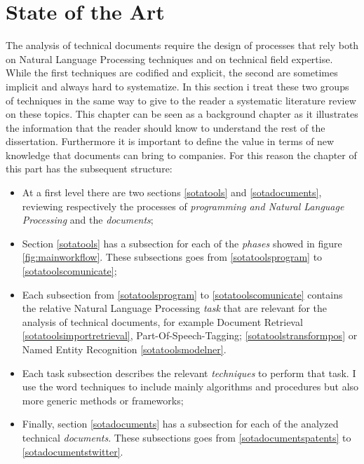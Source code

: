 \documentclass[b5paper,]{book}
\theoremstyle{definition}
\theoremstyle{definition}
\theoremstyle{definition}
\theoremstyle{remark}
\begin{document}
\part{State of the Art}\label{part-state-of-the-art}

The analysis of technical documents require the design of processes that
rely both on Natural Language Processing techniques and on technical
field expertise. While the first techniques are codified and explicit,
the second are sometimes implicit and always hard to systematize. In
this section i treat these two groups of techniques in the same way to
give to the reader a systematic literature review on these topics. This
chapter can be seen as a background chapter as it illustrates the
information that the reader should know to understand the rest of the
dissertation. Furthermore it is important to define the value in terms
of new knowledge that documents can bring to companies. For this reason
the chapter of this part has the subsequent structure:

\begin{itemize}
\item
  At a first level there are two sections \ref{sotatools} and
  \ref{sotadocuments}, reviewing respectively the processes of
  \emph{programming and Natural Language Processing} and the
  \emph{documents};
\item
  Section \ref{sotatools} has a subsection for each of the \emph{phases}
  showed in figure \ref{fig:mainworkflow}. These subsections goes from
  \ref{sotatoolsprogram} to \ref{sotatoolscomunicate};
\item
  Each subsection from \ref{sotatoolsprogram} to
  \ref{sotatoolscomunicate} contains the relative Natural Language
  Processing \emph{task} that are relevant for the analysis of technical
  documents, for example Document Retrieval
  \ref{sotatoolsimportretrieval}, Part-Of-Speech-Tagging;
  \ref{sotatoolstransformpos} or Named Entity Recognition
  \ref{sotatoolsmodelner}.
\item
  Each task subsection describes the relevant \emph{techniques} to
  perform that task. I use the word techniques to include mainly
  algorithms and procedures but also more generic methods or frameworks;
\item
  Finally, section \ref{sotadocuments} has a subsection for each of the
  analyzed technical \emph{documents}. These subsections goes from
  \ref{sotadocumentspatents} to \ref{sotadocumentstwitter}.
\end{itemize}
\end{document}
